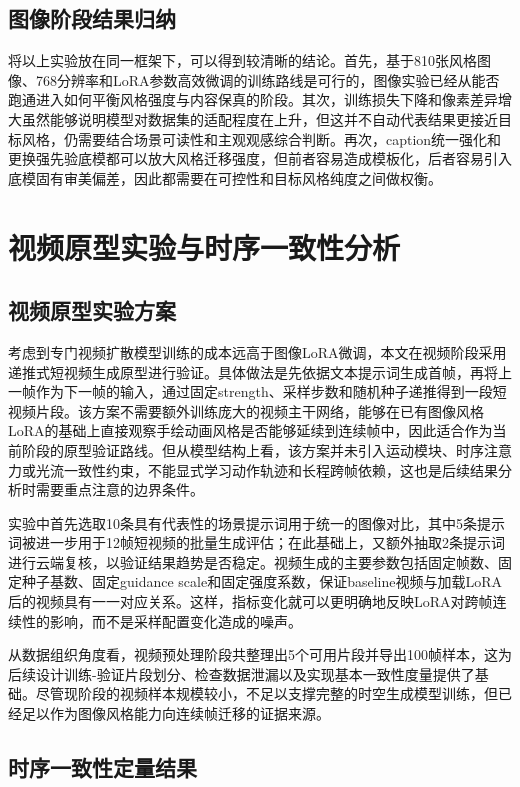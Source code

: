 \subsection{图像阶段结果归纳}

将以上实验放在同一框架下，可以得到较清晰的结论。首先，基于810张风格图像、768分辨率和LoRA参数高效微调的训练路线是可行的，图像实验已经从能否跑通进入如何平衡风格强度与内容保真的阶段。其次，训练损失下降和像素差异增大虽然能够说明模型对数据集的适配程度在上升，但这并不自动代表结果更接近目标风格，仍需要结合场景可读性和主观观感综合判断。再次，caption统一强化和更换强先验底模都可以放大风格迁移强度，但前者容易造成模板化，后者容易引入底模固有审美偏差，因此都需要在可控性和目标风格纯度之间做权衡。

\section{视频原型实验与时序一致性分析}

\subsection{视频原型实验方案}

考虑到专门视频扩散模型训练的成本远高于图像LoRA微调，本文在视频阶段采用递推式短视频生成原型进行验证。具体做法是先依据文本提示词生成首帧，再将上一帧作为下一帧的输入，通过固定strength、采样步数和随机种子递推得到一段短视频片段。该方案不需要额外训练庞大的视频主干网络，能够在已有图像风格LoRA的基础上直接观察手绘动画风格是否能够延续到连续帧中，因此适合作为当前阶段的原型验证路线。但从模型结构上看，该方案并未引入运动模块、时序注意力或光流一致性约束，不能显式学习动作轨迹和长程跨帧依赖，这也是后续结果分析时需要重点注意的边界条件。

实验中首先选取10条具有代表性的场景提示词用于统一的图像对比，其中5条提示词被进一步用于12帧短视频的批量生成评估；在此基础上，又额外抽取2条提示词进行云端复核，以验证结果趋势是否稳定。视频生成的主要参数包括固定帧数、固定种子基数、固定guidance scale和固定强度系数，保证baseline视频与加载LoRA后的视频具有一一对应关系。这样，指标变化就可以更明确地反映LoRA对跨帧连续性的影响，而不是采样配置变化造成的噪声。

从数据组织角度看，视频预处理阶段共整理出5个可用片段并导出100帧样本，这为后续设计训练-验证片段划分、检查数据泄漏以及实现基本一致性度量提供了基础。尽管现阶段的视频样本规模较小，不足以支撑完整的时空生成模型训练，但已经足以作为图像风格能力向连续帧迁移的证据来源。

\subsection{时序一致性定量结果}

